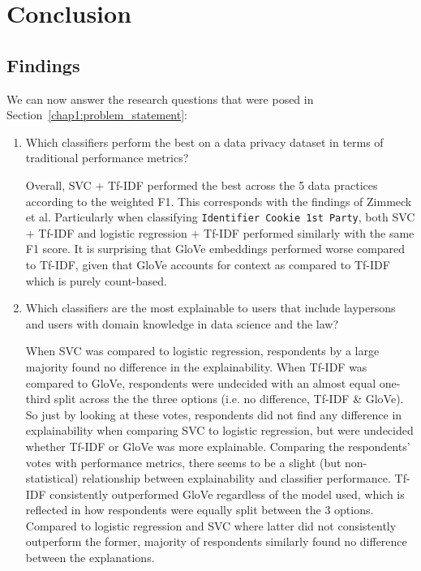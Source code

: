 \chapter{Conclusion} %
\label{chapter6} %

\section{Findings}
We can now answer the research questions that were posed in Section~\ref{chap1:problem_statement}:
\begin{enumerate}
    \item Which classifiers perform the best on a data privacy dataset in terms of traditional performance metrics?
    
    Overall, SVC + Tf-IDF performed the best across the 5 data practices according to the weighted F1. This corresponds with the findings of Zimmeck et al. Particularly when classifying \texttt{Identifier Cookie 1st Party}, both SVC + Tf-IDF and logistic regression + Tf-IDF performed similarly with the same F1 score. It is surprising that GloVe embeddings performed worse compared to Tf-IDF, given that GloVe accounts for context as compared to Tf-IDF which is purely count-based.

    \item Which classifiers are the most explainable to users that include laypersons and users with domain knowledge in data science and the law?
    
    When SVC was compared to logistic regression, respondents by a large majority found no difference in the explainability. When Tf-IDF was compared to GloVe, respondents were undecided with an almost equal one-third split across the the three options (i.e. no difference, Tf-IDF \& GloVe). So just by looking at these votes, respondents did not find any difference in explainability when comparing SVC to logistic regression, but were undecided whether Tf-IDF or GloVe was more explainable. Comparing the respondents' votes with performance metrics, there seems to be a slight (but non-statistical) relationship between explainability and classifier performance. Tf-IDF consistently outperformed GloVe regardless of the model used, which is reflected in how respondents were equally split between the 3 options. Compared to logistic regression and SVC where latter did not consistently outperform the former, majority of respondents similarly found no difference between the explanations. 


\end{enumerate}
